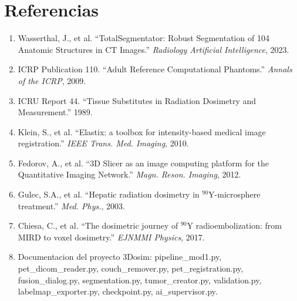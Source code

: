 \documentclass[12pt,a4paper]{article}
\begin{document}
\newpage

\section{Referencias}

\begin{enumerate}
    \item Wasserthal, J., et al. ``TotalSegmentator: Robust Segmentation
          of 104 Anatomic Structures in CT Images.'' \textit{Radiology
          Artificial Intelligence}, 2023.
    \item ICRP Publication 110. ``Adult Reference Computational
          Phantoms.'' \textit{Annals of the ICRP}, 2009.
    \item ICRU Report 44. ``Tissue Substitutes in Radiation Dosimetry
          and Measurement.'' 1989.
    \item Klein, S., et al. ``Elastix: a toolbox for intensity-based
          medical image registration.'' \textit{IEEE Trans. Med.
          Imaging}, 2010.
    \item Fedorov, A., et al. ``3D Slicer as an image computing
          platform for the Quantitative Imaging Network.''
          \textit{Magn. Reson. Imaging}, 2012.
    \item Gulec, S.A., et al. ``Hepatic radiation dosimetry in
          $^{90}$Y-microsphere treatment.'' \textit{Med. Phys.}, 2003.
    \item Chiesa, C., et al. ``The dosimetric journey of $^{90}$Y
          radioembolization: from MIRD to voxel dosimetry.''
          \textit{EJNMMI Physics}, 2017.
    \item Documentacion del proyecto 3Dosim: pipeline\_mod1.py,
          pet\_dicom\_reader.py, couch\_remover.py,
          pet\_registration.py, fusion\_dialog.py, segmentation.py,
          tumor\_creator.py, validation.py, labelmap\_exporter.py,
          checkpoint.py, ai\_supervisor.py.
\end{enumerate}
\end{document}
